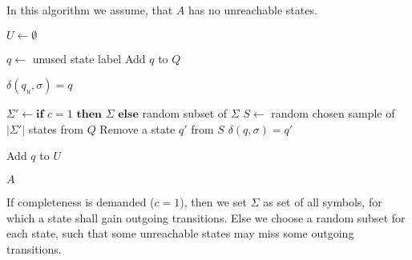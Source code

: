 In this algorithm we assume, that $A$ has no unreachable states.
\vspace{0.2cm}
\begin{algorithmic}[1]
	\State $U \gets \emptyset$ 
	\vspace{0.2cm}
	
	\vspace{0.2cm}
	
		\State $q \gets$ unused state label
		\State Add $q$ to $Q$
		\vspace{0.2cm}
		
		 
			\State $\delta(q_u, \sigma) = q$
		\EndFor
		\vspace{0.2cm}
		
        \State $\Sigma' \gets \textbf{if } c = 1 \textbf{ then } \Sigma \textbf{ else}$ random subset of $\Sigma$ 
		\State $S \gets$ random chosen sample of $|\Sigma'|$ states from $Q$
			\State Remove a state $q'$ from $S$
			\State $\delta(q, \sigma) = q'$
		\EndFor
		\vspace{0.2cm}
		
		\State Add $q$ to $U$
	\EndFor
	\vspace{0.2cm}
	
	\State \Return $A$
	\EndFunction
\end{algorithmic}
\vspace{0.2cm}
If completeness is demanded ($c=1$), then we set $\Sigma$ as set of all symbols, for which a state shall gain outgoing transitions. Else we choose a random subset for each state, such that some unreachable states may miss some outgoing transitions.
